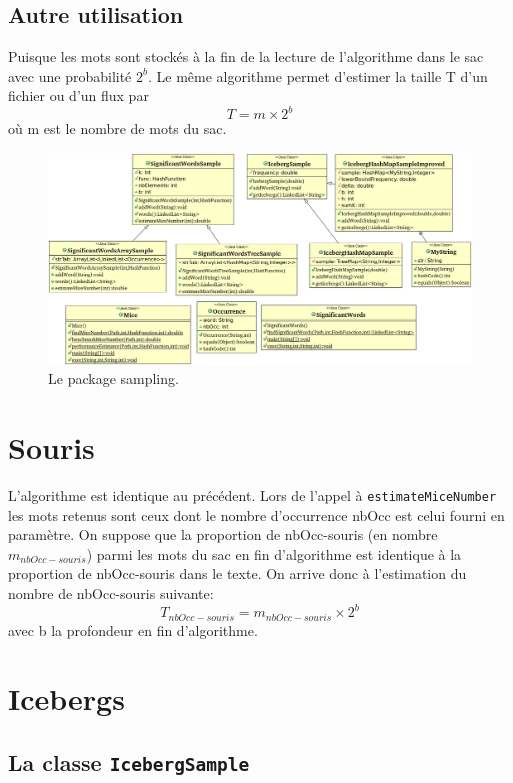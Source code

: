 \documentclass[12pt,a4paper,titlepage]{article}
\newcommand{\class}[1]{\texttt{#1}}
\begin{document}
\subsection{Autre utilisation}

Puisque les mots sont stockés à la fin de la lecture de l'algorithme dans le sac avec une probabilité $2^{b}$. Le même algorithme permet d'estimer la taille T d'un fichier ou d'un flux par
$$ T = m \times 2^{b} $$
où m est le nombre de mots du sac.

\begin{figure}
	\label{fig:samplingPackage}
	\centering
	\includegraphics[scale=0.55, angle=90]{../Java Workspace/Test Hash/samplingPackage.png}
	\caption{Le package sampling.}
\end{figure}



\newpage
\section{Souris}

L'algorithme est identique au précédent. Lors de l'appel à \class{estimateMiceNumber} les mots retenus sont ceux dont le nombre d'occurrence nbOcc est celui fourni en paramètre. On suppose que la proportion de nbOcc-souris (en nombre $m_{nbOcc-souris}$) parmi les mots du sac en fin d'algorithme est identique à la proportion de nbOcc-souris dans le texte. On arrive donc à l'estimation du nombre de nbOcc-souris suivante:
$$ T_{nbOcc-souris} = m_{nbOcc-souris} \times 2^{b} $$
avec b la profondeur en fin d'algorithme.

\newpage
\section{Icebergs}

\subsection{La classe \class{IcebergSample}}
\end{document}
